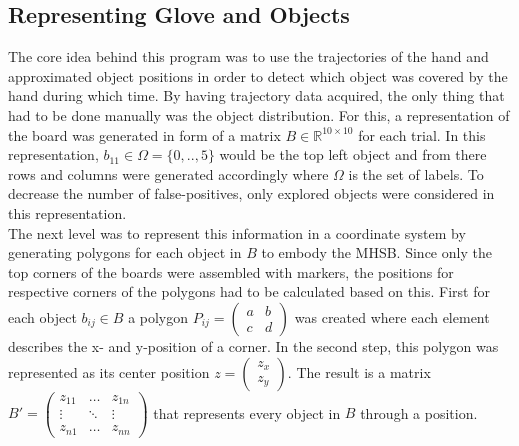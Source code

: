 \subsection{Representing Glove and Objects}
The core idea behind this program was to use the trajectories of the hand and approximated object positions in order to detect which object was covered by the hand during which time. By having trajectory data acquired, the only thing that had to be done manually was the object distribution. For this, a representation of the board was generated in form of a matrix $B \in \mathbb{R}^{10 \times 10}$ for each trial. In this representation, $b_{11} \in \Omega=\{0,..,5\}$ would be the top left object and from there rows and columns were generated accordingly where $\Omega$ is the set of labels. To decrease the number of false-positives, only explored objects were considered in this representation.\\
The next level was to represent this information in a coordinate system by generating polygons for each object in $ B $ to embody the MHSB. Since only the top corners of the boards were assembled with markers, the positions for respective corners of the polygons had to be calculated based on this. First for each object $ b_{ij} \in B $ a polygon $ P_{ij} = \begin{pmatrix}a & b \\ c & d\end{pmatrix} $ was created where each element describes the x- and y-position of a corner. In the second step, this polygon was represented as its center position $ z = \begin{pmatrix}
z_{x} \\ z_{y}
\end{pmatrix}$. The result is a matrix $B' = \begin{pmatrix}
z_{11} & \hdots & z_{1n} \\
\vdots & \ddots & \vdots \\
z_{n1} & \hdots & z_{nn}
\end{pmatrix}$
that represents every object in $ B $ through a position.\\
\\
